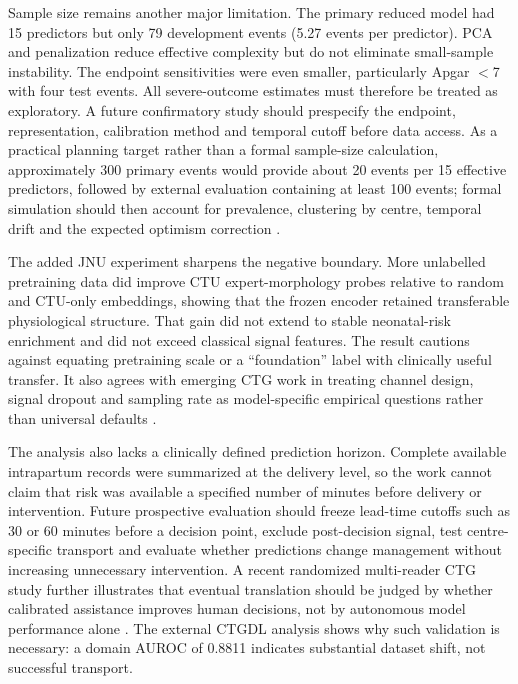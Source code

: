 \documentclass[utf8]{FrontiersinHarvard}
\begin{document}
Sample size remains another major limitation. The primary reduced model had 15 predictors but only 79 development events (5.27 events per predictor). PCA and penalization reduce effective complexity but do not eliminate small-sample instability. The endpoint sensitivities were even smaller, particularly Apgar $<$7 with four test events. All severe-outcome estimates must therefore be treated as exploratory. A future confirmatory study should prespecify the endpoint, representation, calibration method and temporal cutoff before data access. As a practical planning target rather than a formal sample-size calculation, approximately 300 primary events would provide about 20 events per 15 effective predictors, followed by external evaluation containing at least 100 events; formal simulation should then account for prevalence, clustering by centre, temporal drift and the expected optimism correction \citep{steyerberg2019,tripodai2024}.

The added JNU experiment sharpens the negative boundary. More unlabelled pretraining data did improve CTU expert-morphology probes relative to random and CTU-only embeddings, showing that the frozen encoder retained transferable physiological structure. That gain did not extend to stable neonatal-risk enrichment and did not exceed classical signal features. The result cautions against equating pretraining scale or a ``foundation'' label with clinically useful transfer. It also agrees with emerging CTG work in treating channel design, signal dropout and sampling rate as model-specific empirical questions rather than universal defaults \citep{mendis2025crossdatabase,prismctg2026,fridman2026ctgfoundation}.

The analysis also lacks a clinically defined prediction horizon. Complete available intrapartum records were summarized at the delivery level, so the work cannot claim that risk was available a specified number of minutes before delivery or intervention. Future prospective evaluation should freeze lead-time cutoffs such as 30 or 60 minutes before a decision point, exclude post-decision signal, test centre-specific transport and evaluate whether predictions change management without increasing unnecessary intervention. A recent randomized multi-reader CTG study further illustrates that eventual translation should be judged by whether calibrated assistance improves human decisions, not by autonomous model performance alone \citep{benmbarek2026humanai}. The external CTGDL analysis shows why such validation is necessary: a domain AUROC of 0.8811 indicates substantial dataset shift, not successful transport.
\end{document}
